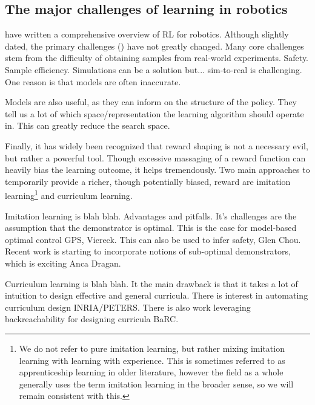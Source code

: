 \subsection{The major challenges of learning in robotics}

\textcite{kober2013reinforcement} have written a comprehensive overview of RL for robotics. Although slightly dated, the primary challenges (\cite[see 8.1 in]{kober2013reinforcement}) have not greatly changed. Many core challenges stem from the difficulty of obtaining samples from real-world experiments.
Safety.
Sample efficiency.
Simulations can be a solution but... sim-to-real is challenging. One reason is that models are often inaccurate.
\par
Models are also useful, as they can inform on the structure of the policy. They tell us a lot of which space/representation the learning algorithm should operate in. This can greatly reduce the search space. \par
Finally, it has widely been recognized that reward shaping is not a necessary evil, but rather a powerful tool. Though excessive massaging of a reward function can heavily bias the learning outcome, it helps tremendously. Two main approaches to temporarily provide a richer, though potentially biased, reward are imitation learning\footnote{We do not refer to pure imitation learning, but rather mixing imitation learning with learning with experience. This is sometimes referred to as apprenticeship learning in older literature, however the field as a whole generally uses the term imitation learning in the broader sense, so we will remain consistent with this.} and curriculum learning. \par
Imitation learning is blah blah. Advantages and pitfalls. It's challenges are the assumption that the demonstrator is optimal. This is the case for model-based optimal control GPS, Viereck. This can also be used to infer safety, Glen Chou. Recent work is starting to incorporate notions of sub-optimal demonstrators, which is exciting Anca Dragan. \par
Curriculum learning is blah blah. It the main drawback is that it takes a lot of intuition to design effective and general curricula. There is interest in automating curriculum design INRIA/PETERS. There is also work leveraging backreachability for designing curricula BaRC.


